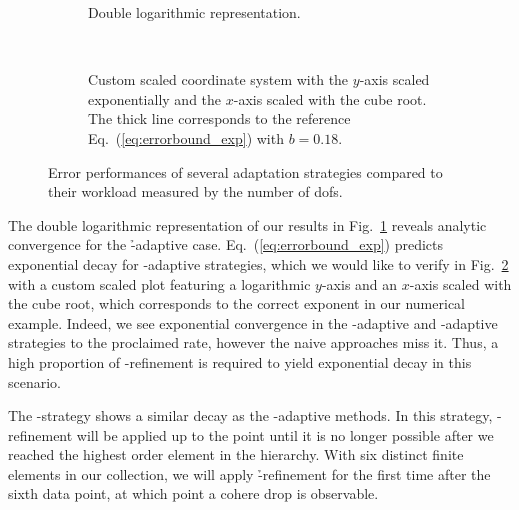 \begin{figure}
\centering
\begin{subfigure}{1\textwidth}
  \centering
  
  \caption{Double logarithmic representation.} %
  \label{fig:errordofsloglog}
\end{subfigure}
\vspace{1em} \\
\begin{subfigure}{1\textwidth}
  \centering
  
  \caption{Custom scaled coordinate system with the $y$-axis scaled exponentially and the $x$-axis scaled with the cube root. The thick line corresponds to the reference Eq.~(\ref{eq:errorbound_exp}) with $b = 0.18$.}
  \label{fig:errordofscustom}
\end{subfigure}
\caption[Error performances of several adaptation strategies compared to their workload measured by the number of .]{Error performances of several adaptation strategies compared to their workload measured by the number of \glspl{dof}.}
\label{fig:errordofs}
\end{figure}

The double logarithmic representation of our results in Fig.~\ref{fig:errordofsloglog} reveals analytic convergence for the \h-adaptive case.
Eq.~(\ref{eq:errorbound_exp}) predicts exponential decay for \hp-adaptive strategies, which we would like to verify in Fig.~\ref{fig:errordofscustom} with a custom scaled plot featuring a logarithmic $y$-axis and an $x$-axis scaled with the cube root, which corresponds to the correct exponent in our numerical example. Indeed, we see exponential convergence in the \p-adaptive and \hp-adaptive strategies to the proclaimed rate, however the naive approaches miss it. Thus, a high proportion of \p-refinement is required to yield exponential decay in this scenario.

The \p-strategy shows a similar decay as the \hp-adaptive methods.
In this strategy, \p-refinement will be applied up to the point until it is no longer possible after we reached the highest order element in the hierarchy. With six distinct finite elements in our collection, we will apply \h-refinement for the first time after the sixth data point, at which point a cohere drop is observable.

